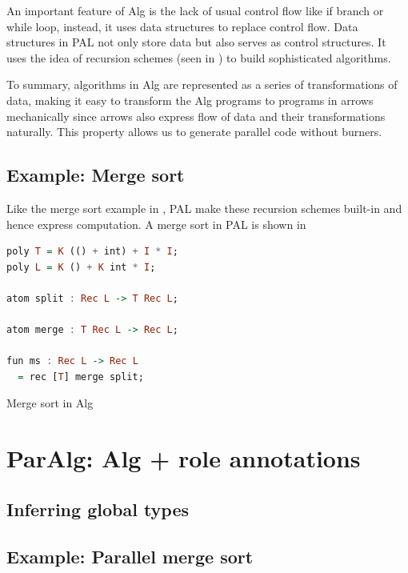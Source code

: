 An important feature of Alg is the lack of usual control flow like if branch or while loop, instead, it uses data structures to replace control flow. Data structures in PAL not only store data but also serves as control structures. It uses the idea of recursion schemes (seen in ) to build sophisticated algorithms. 

To summary, algorithms in Alg are represented as a series of transformations of data, making it easy to transform the Alg programs to programs in arrows mechanically since arrows also express flow of data and their transformations naturally. This property allows us to generate parallel code without burners.

\subsection{Example: Merge sort}

Like the merge sort example in , PAL make these recursion schemes built-in and hence express computation. A merge sort in PAL is shown in 
\begin{listing}[ht]
\begin{lstlisting}[language=haskell]
poly T = K (() + int) + I * I;
poly L = K () + K int * I;

atom split : Rec L -> T Rec L;

atom merge : T Rec L -> Rec L;

fun ms : Rec L -> Rec L
  = rec [T] merge split;
\end{lstlisting}
\caption{Merge sort in Alg} \label{p:pal:c5}
\end{listing}
\section{ParAlg: Alg + role annotations}
\subsection{Inferring global types}
\subsection{Example: Parallel merge sort}
